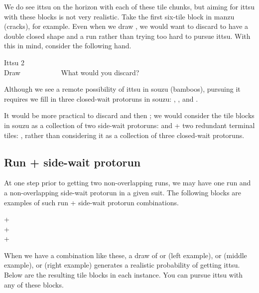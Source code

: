 \noindent
We do see {\jap ittsu} on the horizon with each of these tile chunks, but aiming for {\jap ittsu} with these blocks is not very realistic. Take the first six-tile block in {\jap manzu} (cracks), for example. Even when we draw {\LARGE{}}, we would want to discard {\LARGE{}} to have a double closed shape {\LARGE{}} and a run {\LARGE {}} rather than trying too hard to pursue {\jap ittsu}.
With this in mind, consider the following hand.

\begin{itembox}[r]{{\jap Ittsu} 2}
\bp
{}~\\
\hfill\footnotesize{Draw~~~~~~~~~~~}
\ep
\vspace{-17pt}What would you discard? \vspace{-5pt}
\end{itembox}
\noindent
Although we see a remote possibility of {\jap ittsu} in {\jap souzu} (bamboos), pursuing it requires we fill in three closed-wait protoruns in {\jap souzu}: {\LARGE{}}, {\LARGE{}}, and {\LARGE{}}.

\bigskip
It would be more practical to discard {\LARGE{}} and then {\LARGE{}}; we would consider the tile blocks in {\jap souzu} as a collection of two side-wait protoruns: {\LARGE{}} and {\LARGE{}} + two redundant terminal tiles: {\LARGE{} }, rather than considering it as a collection of three closed-wait protoruns.

\bigskip
\subsection{Run + side-wait protorun}

At one step prior to getting two non-overlapping runs, we may have one run and a non-overlapping side-wait protorun in a given suit. The following blocks are examples of such run + side-wait protorun combinations.

\bigskip
{\begin{center}
{\Huge {}+}  \\ [\sep]
{\Huge {}+} \\ [\sep]
{\Huge {}+}
\end{center}}

\noindent
When we have a combination like these, a draw of {\LARGE{}} or {\LARGE{}} (left example), {\LARGE{}} or {\LARGE{}} (middle example), {\LARGE{}} or {\LARGE{}} (right example) generates a realistic probability of getting {\jap ittsu}. Below are the resulting tile blocks in each instance. You can pursue {\jap ittsu} with any of these blocks.

